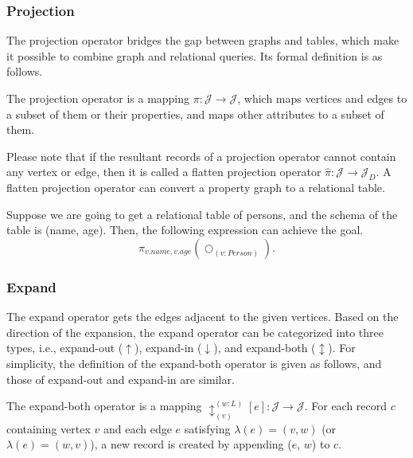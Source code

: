 \subsubsection{Projection}
The projection operator bridges the gap between graphs and tables, which make it possible to combine graph and relational queries.
Its formal definition is as follows.

\begin{definition}
    The projection operator is a mapping $\pi : \mathcal{J} \rightarrow \mathcal{J}$, which maps vertices and edges to a subset of them or their properties, and maps other attributes to a subset of them.
\end{definition}

Please note that if the resultant records of a projection operator cannot contain any vertex or edge, then it is called a flatten projection operator $\hat{\pi} : \mathcal{J} \rightarrow \mathcal{J}_D$.
A flatten projection operator can convert a property graph to a relational table.

\begin{example}
    Suppose we are going to get a relational table of persons, and the schema of the table is (name, age).
    Then, the following expression can achieve the goal.
    \begin{equation*}
        \pi_{v.name, v.age}(\bigcirc_{(v:Person)}).
    \end{equation*}
\end{example}

\subsubsection{Expand}

The expand operator gets the edges adjacent to the given vertices.
Based on the direction of the expansion, the expand operator can be categorized into three types, i.e., expand-out ($\uparrow$), expand-in ($\downarrow$), and expand-both ($\updownarrow$).
For simplicity, the definition of the expand-both operator is given as follows, and those of expand-out and expand-in are similar.

\begin{definition}
    The expand-both operator is a mapping $\updownarrow_{(v)}^{(w:L)}[e] : \mathcal{J} \rightarrow \mathcal{J}$.
    For each record $c$ containing vertex $v$ and each edge $e$ satisfying $\lambda(e) = (v, w)$ (or $\lambda(e) = (w, v)$), a new record is created by appending ($e$, $w$) to $c$.
\end{definition}
 
